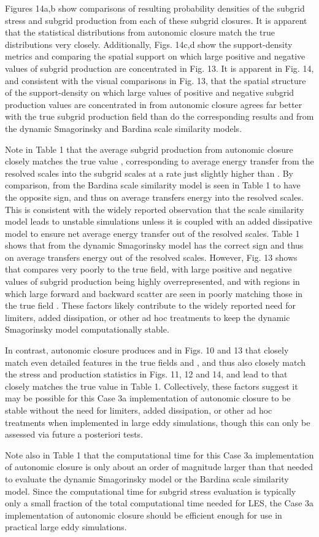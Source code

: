 Figures 14a,b show comparisons of resulting probability densities of the subgrid stress and subgrid production from each of these subgrid closures. It is apparent that the statistical distributions from autonomic closure match the true distributions very closely.  Additionally, Figs. 14c,d show the support-density metrics   and   comparing the spatial support on which large positive and negative values of subgrid production are concentrated in Fig. 13. It is apparent in Fig. 14, and consistent with the visual comparisons in Fig. 13, that the spatial structure of the support-density on which large values of positive and negative subgrid production values are concentrated in   from autonomic closure agrees far better with the true subgrid production field   than do the corresponding results   and   from the dynamic Smagorinsky and Bardina scale similarity models.

Note in Table 1 that the average subgrid production   from autonomic closure closely matches the true value  , corresponding to average energy transfer from the resolved scales into the subgrid scales at a rate just slightly higher than  . By comparison,   from the Bardina scale similarity model is seen in Table 1 to have the opposite sign, and thus on average transfers energy into the resolved scales. This is consistent with the widely reported observation that the scale similarity model leads to unstable simulations unless it is coupled with an added dissipative model to ensure net average energy transfer out of the resolved scales. Table 1 shows that   from the dynamic Smagorinsky model has the correct sign and thus on average transfers energy out of the resolved scales. However, Fig. 13 shows that   compares very poorly to the true   field, with large positive and negative values of subgrid production being highly overrepresented, and with regions in which large forward and backward scatter are seen in   poorly matching those in the true field  . These factors likely contribute to the widely reported need for limiters, added dissipation, or other ad hoc treatments to keep the dynamic Smagorinsky model computationally stable. 

In contrast, autonomic closure produces   and   in Figs. 10 and 13 that closely match even detailed features in the true fields   and  , and thus also closely match the stress and production statistics in Figs. 11, 12 and 14, and lead to   that closely matches the true value   in Table 1. Collectively, these factors suggest it may be possible for this Case 3a implementation of autonomic closure to be stable without the need for limiters, added dissipation, or other ad hoc treatments when implemented in large eddy simulations, though this can only be assessed via future a posteriori tests. 

Note also in Table 1 that the computational time for this Case 3a implementation of autonomic closure is only about an order of magnitude larger than that needed to evaluate the dynamic Smagorinsky model or the Bardina scale similarity model. Since the computational time for subgrid stress evaluation is typically only a small fraction of the total computational time needed for LES, the Case 3a implementation of autonomic closure should be efficient enough for use in practical large eddy simulations.
